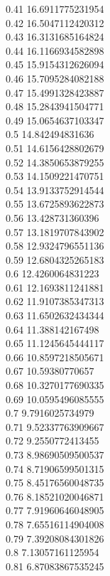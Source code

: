 {0.41	16.6911775231954\\
0.42	16.5047112420312\\
0.43	16.3131685164824\\
0.44	16.1166934582898\\
0.45	15.9154312626094\\
0.46	15.7095284082188\\
0.47	15.4991328423887\\
0.48	15.2843941504771\\
0.49	15.0654637103347\\
0.5	14.842494831636\\
0.51	14.6156428802679\\
0.52	14.3850653879255\\
0.53	14.1509221470751\\
0.54	13.9133752914544\\
0.55	13.6725893622873\\
0.56	13.428731360396\\
0.57	13.1819707843902\\
0.58	12.9324796551136\\
0.59	12.6804325265183\\
0.6	12.4260064831223\\
0.61	12.1693811241881\\
0.62	11.9107385347313\\
0.63	11.6502632434344\\
0.64	11.388142167498\\
0.65	11.1245645444117\\
0.66	10.8597218505671\\
0.67	10.59380770657\\
0.68	10.3270177690335\\
0.69	10.0595496085555\\
0.7	9.7916025734979\\
0.71	9.52337763909667\\
0.72	9.2550772413455\\
0.73	8.98690509500537\\
0.74	8.71906599501315\\
0.75	8.45176560048735\\
0.76	8.18521020046871\\
0.77	7.91960646048905\\
0.78	7.65516114904008\\
0.79	7.39208084301826\\
0.8	7.13057161125954\\
0.81	6.87083867535245\\
}
